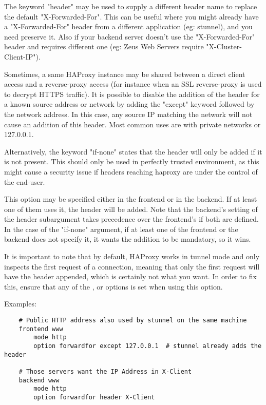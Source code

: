   The keyword "header" may be used to supply a different header name to replace
  the default "X-Forwarded-For". This can be useful where you might already
  have a "X-Forwarded-For" header from a different application (eg: stunnel),
  and you need preserve it. Also if your backend server doesn't use the
  "X-Forwarded-For" header and requires different one (eg: Zeus Web Servers
  require "X-Cluster-Client-IP").

  Sometimes, a same HAProxy instance may be shared between a direct client
  access and a reverse-proxy access (for instance when an SSL reverse-proxy is
  used to decrypt HTTPS traffic). It is possible to disable the addition of the
  header for a known source address or network by adding the "except" keyword
  followed by the network address. In this case, any source IP matching the
  network will not cause an addition of this header. Most common uses are with
  private networks or 127.0.0.1.

  Alternatively, the keyword "if-none" states that the header will only be
  added if it is not present. This should only be used in perfectly trusted
  environment, as this might cause a security issue if headers reaching haproxy
  are under the control of the end-user.

  This option may be specified either in the frontend or in the backend. If at
  least one of them uses it, the header will be added. Note that the backend's
  setting of the header subargument takes precedence over the frontend's if
  both are defined. In the case of the "if-none" argument, if at least one of
  the frontend or the backend does not specify it, it wants the addition to be
  mandatory, so it wins.

  It is important to note that by default, HAProxy works in tunnel mode and
  only inspects the first request of a connection, meaning that only the first
  request will have the header appended, which is certainly not what you want.
  In order to fix this, ensure that any of the ,  or
   options is set when using this option.

  Examples:
\begin{verbatim}
    # Public HTTP address also used by stunnel on the same machine
    frontend www
        mode http
        option forwardfor except 127.0.0.1  # stunnel already adds the header

    # Those servers want the IP Address in X-Client
    backend www
        mode http
        option forwardfor header X-Client
\end{verbatim}

